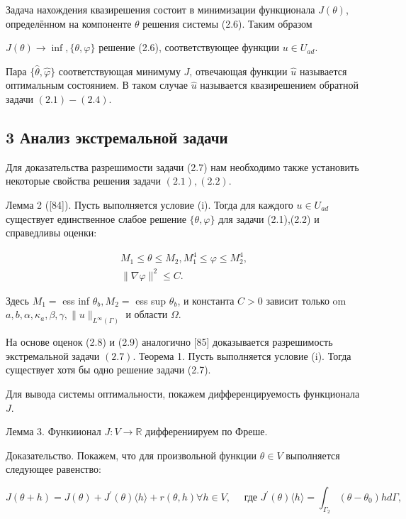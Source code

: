 \documentclass[10pt]{article}
\begin{document}
Задача нахождения квазирешения состоит в минимизации функционала $J(\theta)$, определённом на компоненте $\theta$ решения системы (2.6). Таким образом

$J(\theta) \rightarrow \inf ,\{\theta, \varphi\}$ решение (2.6), соответствующее функции $u \in U_{a d}$.

Пара $\{\hat{\theta}, \hat{\varphi}\}$ соответствующая минимуму $J$, отвечающая функции $\hat{u}$ называется оптимальным состоянием. В таком случае $\hat{u}$ называется квазирешением обратной задачи $(2.1)-(2.4)$.

\subsection{3 Анализ экстремальной задачи}
Для доказательства разрешимости задачи (2.7) нам необходимо также установить некоторые свойства решения задачи $(2.1),(2.2)$.

Лемма 2 ([84]). Пусть выполняется условие (i). Тогда для каждого $u \in U_{a d}$ существует единственное слабое решение $\{\theta, \varphi\}$ для задачи (2.1),(2.2) и справедливы оценки:

$$
\begin{gathered}
M_{1} \leqslant \theta \leqslant M_{2}, M_{1}^{4} \leqslant \varphi \leqslant M_{2}^{4}, \\
\|\nabla \varphi\|^{2} \leqslant C .
\end{gathered}
$$

Здесь $M_{1}=$ ess inf $\theta_{b}, M_{2}=$ ess sup $\theta_{b}$, и константа $C>0$ зависит только om $a, b, \alpha, \kappa_{a}, \beta, \gamma,\|u\|_{L^{\infty}(\Gamma)}$ и области $\Omega$.

На основе оценок (2.8) и (2.9) аналогично [85] доказывается разрешимость экстремальной задачи $(2.7)$. Теорема 1. Пусть выполняется условие (i). Тогда существует хотя бы одно решение задачи (2.7).

Для вывода системы оптимальности, покажем дифференцируемость функционала $J$.

Лемма 3. Функиионал $J: V \rightarrow \mathbb{R}$ дифферениируем по Фреше.

Доказательство. Покажем, что для произвольной функции $\theta \in V$ выполняется следующее равенство:

$$
J(\theta+h)=J(\theta)+J^{\prime}(\theta)\langle h\rangle+r(\theta, h) \forall h \in V, \quad \text { где } J^{\prime}(\theta)\langle h\rangle=\int_{\Gamma_{2}}\left(\theta-\theta_{0}\right) h d \Gamma,
$$
\end{document}
